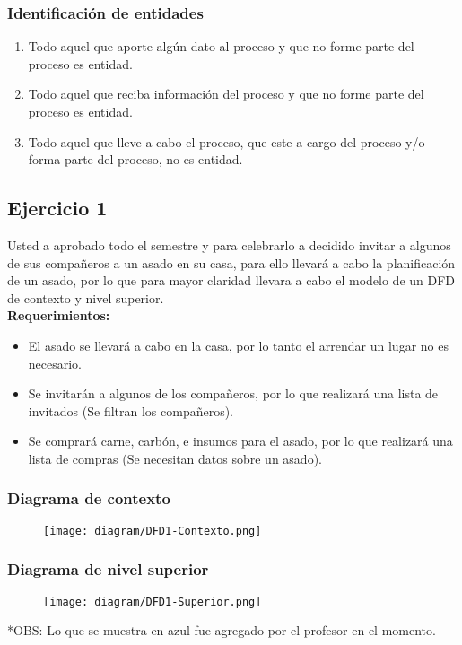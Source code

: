 \documentclass{templateNote}
\begin{document}
\subsubsection{Identificación de entidades}
\begin{enumerate}
    \item Todo aquel que aporte algún dato al proceso y que no forme parte del proceso es entidad.
    
    \item Todo aquel que reciba información del proceso y que no forme parte del proceso es entidad.
    
    \item Todo aquel que lleve a cabo el proceso, que este a cargo del proceso y/o forma parte del proceso, no es entidad.
\end{enumerate}

\newpage
\subsection{Ejercicio 1}
Usted a aprobado todo el semestre y para celebrarlo a decidido invitar a algunos de sus compañeros a un asado en su casa, para ello llevará a cabo la planificación de un asado, por lo que para mayor claridad llevara a cabo el modelo de un DFD de contexto y nivel superior.\\
\textbf{Requerimientos:}
\begin{itemize}
    \item El asado se llevará a cabo en la casa, por lo tanto el arrendar un lugar no es necesario.
    
    \item Se invitarán a algunos de los compañeros, por lo que realizará una lista de invitados (Se filtran los compañeros).
    
    \item Se comprará carne, carbón, e insumos para el asado, por lo que realizará una lista de compras (Se necesitan datos sobre un asado).
\end{itemize}

\subsubsection{Diagrama de contexto}
\begin{figure}[H]
    \centering
    \texttt{[image: diagram/DFD1-Contexto.png]}
\end{figure}

\newpage
\subsubsection{Diagrama de nivel superior}
\begin{figure}[H]
    \centering
    \texttt{[image: diagram/DFD1-Superior.png]}
\end{figure}
*OBS: Lo que se muestra en azul fue agregado por el profesor en el momento.
\end{document}
